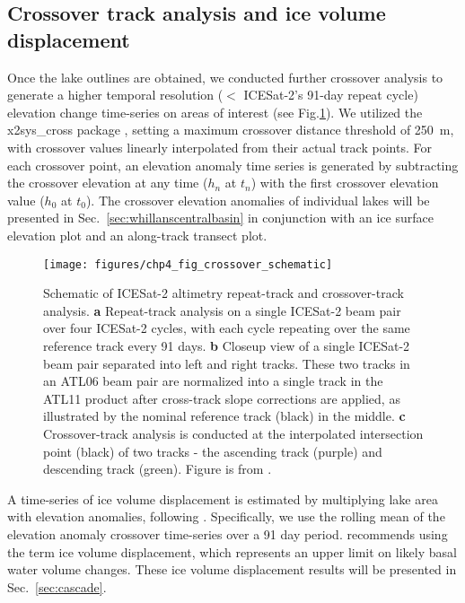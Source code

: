\subsection{Crossover track analysis and ice volume displacement} \label{sec:crossover_displacement}

Once the lake outlines are obtained, we conducted further crossover analysis to generate a higher temporal resolution ($<$ ICESat-2's 91-day repeat cycle) elevation change time-series on areas of interest (see Fig.\ref{fig:crossover_schematic}).
We utilized the x2sys\_cross package \citep{WesselToolsanalyzingintersecting2010}, setting a maximum crossover distance threshold of \SI{250}{\metre}, with crossover values linearly interpolated from their actual track points.
For each crossover point, an elevation anomaly time series is generated by subtracting the crossover elevation at any time ($h_n$ at $t_n$) with the first crossover elevation value ($h_0$ at $t_0$).
The crossover elevation anomalies of individual lakes will be presented in Sec.~\ref{sec:whillanscentralbasin} in conjunction with an ice surface elevation plot and an along-track transect plot.

\begin{figure}[htbp]
  \centering
  \texttt{[image: figures/chp4\_fig\_crossover\_schematic]}
  \caption[Schematic of ICESat-2 altimetry repeat-track and crossover-track analysis]{
    Schematic of ICESat-2 altimetry repeat-track and crossover-track analysis.
    \textbf{a} Repeat-track analysis on a single ICESat-2 beam pair over four ICESat-2 cycles, with each cycle repeating over the same reference track every 91 days.
    \textbf{b} Closeup view of a single ICESat-2 beam pair separated into left and right tracks.
    These two tracks in an ATL06 beam pair are normalized into a single track in the ATL11 product after cross-track slope corrections are applied, as illustrated by the nominal reference track (black) in the middle.
    \textbf{c} Crossover-track analysis is conducted at the interpolated intersection point (black) of two tracks - the ascending track (purple) and descending track (green).
    Figure is from \citet{LiMappinggroundingzone2020}.
  }
  \label{fig:crossover_schematic}
\end{figure}

A time-series of ice volume displacement is estimated by multiplying lake area with elevation anomalies, following \citet{SiegfriedEpisodicicevelocity2016,KimActivesubglaciallakes2016}.
Specifically, we use the rolling mean of the elevation anomaly crossover time-series over a 91 day period. %
\citet{SiegfriedEpisodicicevelocity2016} recommends using the term ice volume displacement, which represents an upper limit on likely basal water volume changes.
These ice volume displacement results will be presented in Sec.~\ref{sec:cascade}.

